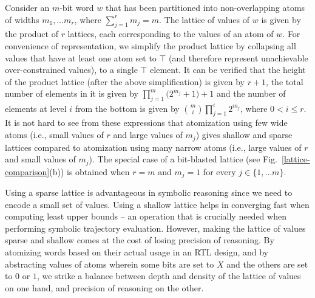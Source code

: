 \documentclass{llncs}
\begin{document}
Consider an $m$-bit word $w$ that has been partitioned into
non-overlapping atoms of widths $m_1, \ldots m_r$, where $\sum_{j=1}^r
m_j = m$.  The lattice of values of $w$ is given by the product of $r$
lattices, each corresponding to the values of an atom of $w$.  For
convenience of representation, we simplify the product lattice by
collapsing all values that have at least one atom set to $\top$ (and
therefore represent unachievable over-constrained values), to a single
$\top$ element.
It can be verified that the height of the product lattice (after the
above simplification) is given by $r+1$, the total number of elements
in it is given by $\prod_{j=1}^m \big(2^{m_j} + 1\big) + 1$ and the
number of elements at level $i$ from the bottom is given by
$\binom{m}{i} \prod_{j=1}^i 2^{m_j}$, where $0 < i \le r$.  It is not
hard to see from these expressions that atomization using few wide atoms (i.e.,
small values of $r$ and large values of $m_j$) gives shallow and
sparse lattices compared to atomization using many narrow atoms (i.e.,
large values of $r$ and small values of $m_j$).  The special case of a
bit-blasted lattice (see Fig.~\ref{lattice-comparison}(b)) is obtained
when $r = m$ and $m_j = 1$ for every $j \in \{1, \ldots m\}$.

Using a sparse lattice is advantageous in symbolic reasoning since we
need to encode a small set of values.  Using a shallow lattice helps
in converging fast when computing least upper bounds -- an operation
that is crucially needed when performing symbolic trajectory
evaluation.  However, making the lattice of values sparse and shallow
comes at the cost of losing precision of reasoning.  By atomizing
words based on their actual usage in an RTL design, and by abstracting
values of atoms wherein some bits are set to $X$ and the others are
set to $0$ or $1$, we strike a balance between depth and density of
the lattice of values on one hand, and precision of reasoning on the
other.
\end{document}

